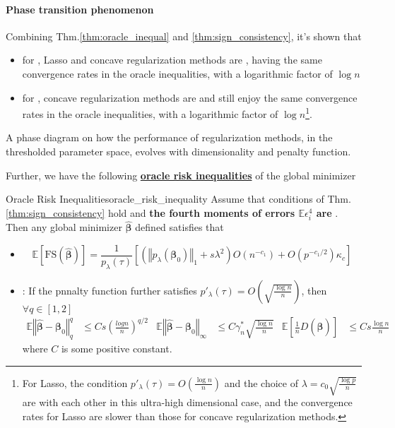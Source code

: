 \documentclass[twoside]{article}
\begin{document}
\paragraph{Phase transition phenomenon}
Combining Thm.\ref{thm:oracle_inequal} and \ref{thm:sign_consistency}, it's shown that
\begin{itemize}
    \item for , Lasso and concave regularization methods are , having the same convergence rates in the oracle inequalities, with a logarithmic factor of $\log n$
    \item for , concave regularization methods are  and still enjoy the same convergence rates in the oracle inequalities, with a logarithmic factor of $\log n$\footnote{For Lasso, the condition $p'_{\lambda}(\tau) = O\left(\frac{\log n}{n}\right)$ and the choice of $\lambda = c_0\sqrt{\frac{\log p}{n}}$ are  with each other in this ultra-high dimensional case, and the convergence rates for Lasso  are slower than those for concave regularization methods.}.
\end{itemize}
A phase diagram on how the performance of regularization methods, in the thresholded parameter space, evolves with dimensionality and penalty function.

Further, we have the following \textbf{\underline{oracle risk inequalities}} of the global minimizer
\begin{theorem}{Oracle Risk Inequalities}{oracle_risk_inequality}
    Assume that conditions of Thm.\ref{thm:sign_consistency} hold and \textbf{the fourth moments of errors $\mathbb{E}\epsilon_i^4$ are  } . Then any global minimizer $\hat{\boldsymbol{\beta}}$ defined satisfies that 
    \begin{itemize}
        \item {} $$ \mathbb{E}\left[\mathrm{FS}\left(\hat{\boldsymbol{\beta}}\right)\right] = \frac{1}{p_{\lambda}(\tau)}\left[ \left(\left\Vert p_{\lambda}\left(\boldsymbol{\beta}_0\right) \right\Vert _1 + s\lambda^2 \right) O(n^{-c_1})+ O(p^{-c_1/2})\kappa_c \right] $$
        \item {}: If the pnnalty function further satisfies $p'_{\lambda}(\tau) = O\left(\sqrt{\frac{\log n}{n}}\right)$, then $\forall q\in[1,2]$
        \begin{align*}
            \mathbb{E}\left\Vert \hat{\boldsymbol{\beta}}-\boldsymbol{\beta}_0 \right\Vert^q_q &\leq Cs\left(\frac{log n}{n}\right)^{q/2} & \mathbb{E}\left\Vert \hat{\boldsymbol{\beta}}-\boldsymbol{\beta}_0 \right\Vert _{\infty} &\leq C\gamma_n^*\sqrt{\frac{\log n}{n}} & \mathbb{E}\left[\frac{1}{n}D\left(\hat{\boldsymbol{\beta}}\right)\right] &\leq Cs\frac{\log n}{n}
        \end{align*}
        where $C$ is some positive constant.
    \end{itemize}
\end{theorem}
\end{document}
